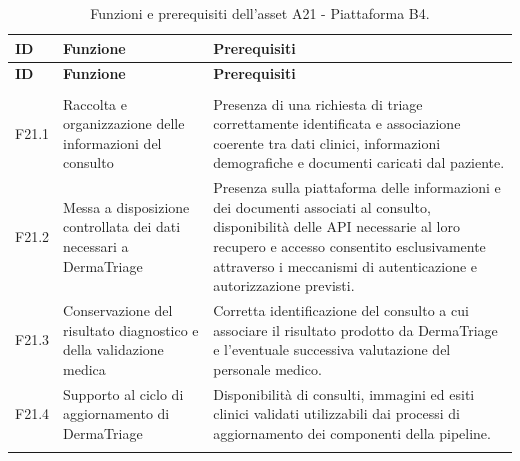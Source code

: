 

{
\small
{}
\setlength{\tabcolsep}{4pt}
\renewcommand{\arraystretch}{1.08}

\begin{xltabular}{\textwidth}{
    >{\raggedright\arraybackslash}p{1.1cm}
    >{\raggedright\arraybackslash}p{3.8cm}
    X
}

\toprule

\textbf{ID} &
\textbf{Funzione} &
\textbf{Prerequisiti} \\

\midrule

\endfirsthead

\toprule

\textbf{ID} &
\textbf{Funzione} &
\textbf{Prerequisiti} \\

\midrule

\endhead

 \\
\endfoot

\endlastfoot


F21.1 &
Raccolta e organizzazione delle informazioni del consulto &
Presenza di una richiesta di triage correttamente identificata e
associazione coerente tra dati clinici, informazioni demografiche
e documenti caricati dal paziente. \\

\midrule

F21.2 &
Messa a disposizione controllata dei dati necessari a DermaTriage &
Presenza sulla piattaforma delle informazioni e dei documenti
associati al consulto, disponibilità delle API necessarie al loro
recupero e accesso consentito esclusivamente attraverso i meccanismi
di autenticazione e autorizzazione previsti. \\

\midrule

F21.3 &
Conservazione del risultato diagnostico e della validazione medica &
Corretta identificazione del consulto a cui associare il risultato
prodotto da DermaTriage e l'eventuale successiva valutazione del
personale medico. \\

\midrule

F21.4 &
Supporto al ciclo di aggiornamento di DermaTriage &
Disponibilità di consulti, immagini ed esiti clinici validati
utilizzabili dai processi di aggiornamento dei componenti della
pipeline. \\

\bottomrule

\caption{Funzioni e prerequisiti dell'asset A21 - Piattaforma B4.}
\label{tab:a21-functions}\\

\end{xltabular}
}

